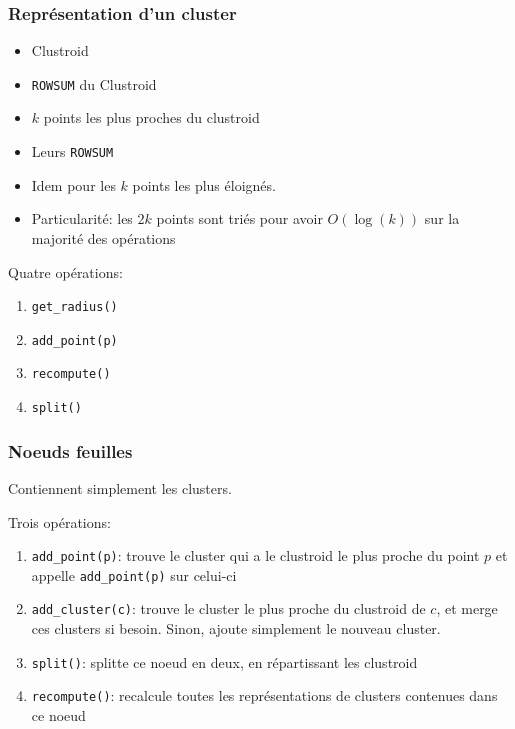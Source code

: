 \documentclass{beamer}
\begin{document}
 	\begin{frame}
 		\frametitle{Représentation d'un cluster}
 		\begin{itemize}
 			\item Clustroid
 			\item \texttt{ROWSUM} du Clustroid
 			\item $k$ points les plus proches du clustroid
 			\item Leurs \texttt{ROWSUM}
 			\item Idem pour les $k$ points les plus éloignés.
 			\item Particularité: les $2k$ points sont \alert{triés} pour avoir $O(\log(k))$ sur la majorité des opérations
 		\end{itemize}
 		
 		Quatre opérations:
 		\begin{enumerate}
 			\item \texttt{get\_radius()}
 			\item \texttt{add\_point(p)}
 			\item \texttt{recompute()}
 			\item \texttt{split()}
		\end{enumerate}
 	\end{frame}
 	
 	\begin{frame}
 		\frametitle{Noeuds feuilles}
 		Contiennent simplement les clusters.
 		
 		Trois opérations:
 		\begin{enumerate}
 			\item \texttt{add\_point(p)}: trouve le cluster qui a le clustroid le plus proche du point $p$ et appelle \texttt{add\_point(p)} sur celui-ci
 			\item \texttt{add\_cluster(c)}: trouve le cluster le plus proche du clustroid de $c$, et merge ces clusters si besoin. Sinon, ajoute simplement le nouveau cluster.
 			\item \texttt{split()}: splitte ce noeud en deux, en répartissant les clustroid
 			\item \texttt{recompute()}: recalcule toutes les représentations de clusters contenues dans ce noeud
 		\end{enumerate}
 	\end{frame}
 	
\end{document}
